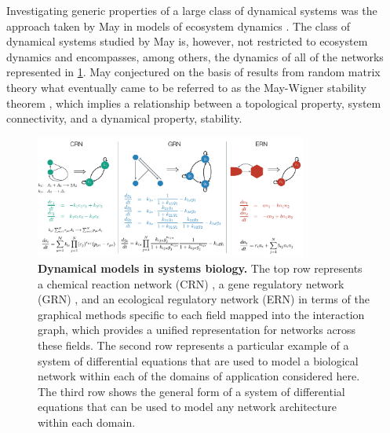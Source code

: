 Investigating generic properties of a large class of dynamical systems was the approach taken by May in models of ecosystem dynamics \cite{Gardner1970,May1972}. The class of dynamical systems studied by May is, however, not restricted to ecosystem dynamics and encompasses, among others, the dynamics of all of the networks represented in \ref{fig:biomodelexamples}. May conjectured on the basis of results from random matrix theory what eventually came to be referred to as the May-Wigner stability theorem \cite{Cohen1984,May1972a,Radius2014,Majumdar2014}, which implies a relationship between a topological property, system connectivity, and a dynamical property, stability.

\begin{figure}[!ht]
\centering
\noindent\includegraphics[width=0.8\textwidth]{fig/biomodelexamples.pdf}
\caption{{\bf Dynamical models in systems biology.} The top row represents a chemical reaction network (CRN) \cite{Shinar2010}, a gene regulatory network (GRN) \cite{Karlebach2008}, and an ecological regulatory network (ERN) \cite{Rohr2014} in terms of the graphical methods specific to each field mapped into the interaction graph, which provides a unified representation for networks across these fields. The second row represents a particular example of a system of differential equations that are used to model a biological network within each of the domains of application considered here. The third row shows the general form of a system of differential equations that can be used to model any network architecture within each domain.}
\label{fig:biomodelexamples}
\end{figure}

